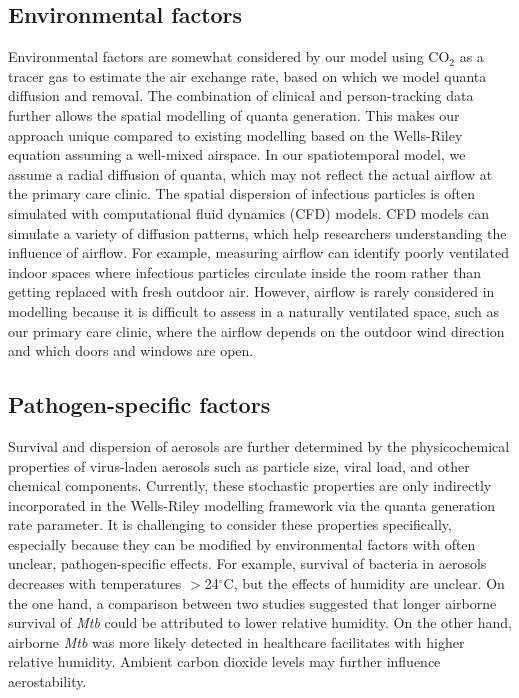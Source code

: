 \documentclass[fleqn,11pt]{wlscirep_supp}
\begin{document}
\subsection{Environmental factors}

Environmental factors are somewhat considered by our model using CO$_2$ as a tracer gas to estimate the air exchange rate, based on which we model quanta diffusion and removal. The combination of clinical and person-tracking data further allows the spatial modelling of quanta generation. This makes our approach unique compared to existing modelling based on the Wells-Riley equation assuming a well-mixed airspace\cite{Riley1961Book,Rudnick2003IndoorAir}. In our spatiotemporal model, we assume a radial diffusion of quanta, which may not reflect the actual airflow at the primary care clinic. The spatial dispersion of infectious particles is often simulated with computational fluid dynamics (CFD) models\cite{Vuorinen2020SafSci,Jung2021InfectChemo,Li2021BuildEnv}. CFD models can simulate a variety of diffusion patterns, which help researchers understanding the influence of airflow. For example, measuring airflow can identify poorly ventilated indoor spaces where infectious particles circulate inside the room rather than getting replaced with fresh outdoor air\cite{Li2021BuildEnv}. However, airflow is rarely considered in modelling because it is difficult to assess in a naturally ventilated space, such as our primary care clinic, where the airflow depends on the outdoor wind direction and which doors and windows are open. 

\subsection{Pathogen-specific factors}

Survival and dispersion of aerosols are further determined by the physicochemical properties of virus-laden aerosols such as particle size, viral load, and other chemical components\cite{Wang2021Science}. Currently, these stochastic properties are only indirectly incorporated in the Wells-Riley modelling framework via the quanta generation rate parameter\cite{Riley1961Book,Rudnick2003IndoorAir}. It is challenging to consider these properties specifically, especially because they can be modified by environmental factors with often unclear, pathogen-specific effects\cite{Songer1967,Chan2011AdvVir,Fernstrom2013JoP,Cox1995Book,Fernstrom2013JoP,Tang2009Interface}. For example, survival of bacteria in aerosols decreases with temperatures $>$24$^{\circ}$C, but the effects of humidity are unclear\cite{Tang2009Interface}. On the one hand, a comparison between two studies suggested that longer airborne survival of \emph{Mtb} could be attributed to lower relative humidity\cite{Loudon1969AMRRD,Lever2000LettersAppliedMicrobio}. On the other hand, airborne \emph{Mtb} was more likely detected in healthcare facilitates with higher relative humidity\cite{Sornboot2019IJTLD,Matuka2021IJERP}. Ambient carbon dioxide levels may further influence aerostability\cite{Haddrell2024NatCommun}.    
\end{document}
